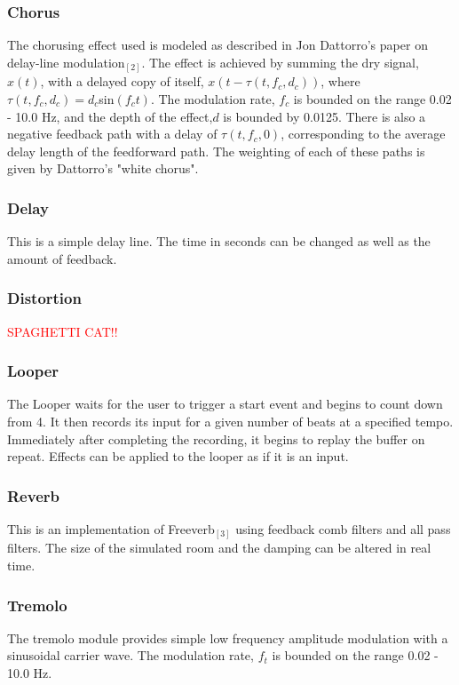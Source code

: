\documentclass[pdftext,twoside,10pt]{article}
\newcommand{\spag}{\textcolor{red}{SPAGHETTI CAT!!}}
\begin{document}
\subsubsection{Chorus} 
The chorusing effect used is modeled as described in Jon Dattorro's paper on delay-line modulation$_{[2]}$. The effect is achieved by summing the dry signal, $x(t)$, with a delayed copy of itself, $x(t - \tau(t,f_c,d_c))$, where $\tau(t,f_c,d_c) =d_c$sin$(f_ct)$. The modulation rate, $f_c$ is bounded on the range 0.02 - 10.0 Hz, and the depth of the effect,$d$ is bounded by 0.0125. There is also a negative feedback path with a delay of $\tau(t,f_c,0)$, corresponding to the average delay length of the feedforward path. The weighting of each of these paths is given by Dattorro's "white chorus".

\subsubsection{Delay}
This is a simple delay line. The time in seconds can be changed as well as the amount of feedback.

\subsubsection{Distortion}
\spag

\subsubsection{Looper}
The Looper waits for the user to trigger a start event and begins to count down from 4. It then records its input for a given number of beats at a specified tempo. Immediately after completing the recording, it begins to replay the buffer on repeat. Effects can be applied to the looper as if it is an input. 

\subsubsection{Reverb}
This is an implementation of Freeverb$_{[3]}$ using feedback comb filters and all pass filters. The size of the simulated room and the damping can be altered in real time.

\subsubsection{Tremolo} 
The tremolo module provides simple low frequency amplitude modulation with a sinusoidal carrier wave. The modulation rate, $f_t$ is bounded on the range 0.02 - 10.0 Hz.
\end{document}
